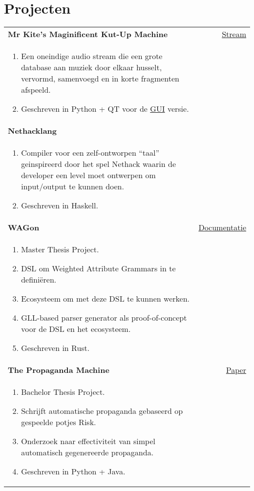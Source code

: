 \documentclass[a4paper,12pt]{article}
\begin{document}
\section{Projecten}

\begin{tabularx}{\linewidth}{ @{}l r@{} }

\textbf{Mr Kite's Maginificent Kut-Up Machine} & \hfill \href{https://mkmkm.thebias.nl}{Stream} \\[3.75pt]
\begin{enumerate}
    \item Een oneindige audio stream die een grote database aan muziek door elkaar husselt, vervormd, samenvoegd en in korte fragmenten afspeeld.
    \item Geschreven in Python + QT voor de \href{https://github.com/Rafaeltheraven/Mr-Kite-s-Magnificent-Kut-up-Machine}{GUI} versie.
\end{enumerate} \\

\textbf{Nethacklang} \\
\begin{enumerate}
    \item Compiler voor een zelf-ontworpen ``taal'' geinspireerd door het spel Nethack waarin de developer een level moet ontwerpen om input/output te kunnen doen.
    \item Geschreven in Haskell.
\end{enumerate} \\

\textbf{WAGon} & \hfill \href{https://wagon.thebias.nl/}{Documentatie} \\[3.75pt]
\begin{enumerate}
    \item Master Thesis Project.
    \item DSL om Weighted Attribute Grammars in te definiëren.
    \item Ecosysteem om met deze DSL te kunnen werken.
    \item GLL-based parser generator als proof-of-concept voor de DSL en het ecosysteem.
    \item Geschreven in Rust.
\end{enumerate} \\

\textbf{The Propaganda Machine} & \hfill \href{https://ieee-cog.org/2021/assets/papers/paper_231.pdf}{Paper}\cite{dulfer-propaganda-2021} \\[3.75pt]
\begin{enumerate}
    \item Bachelor Thesis Project.
    \item Schrijft automatische propaganda gebaseerd op gespeelde potjes Risk.
    \item Onderzoek naar effectiviteit van simpel automatisch gegenereerde propaganda.
    \item Geschreven in Python + Java.
\end{enumerate} \\

\end{tabularx}
\end{document}

